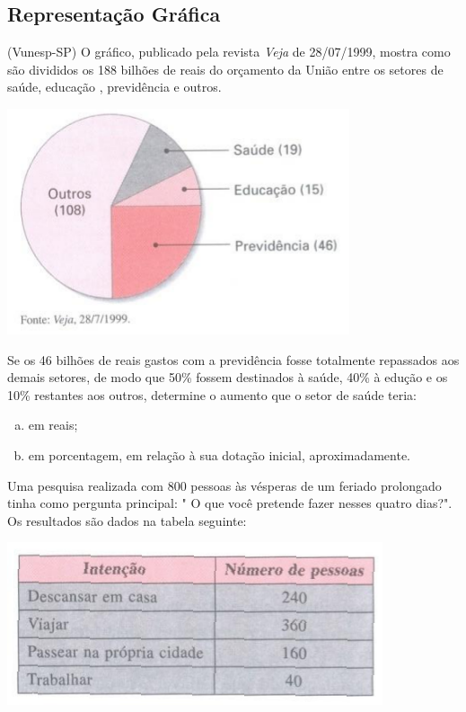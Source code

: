 \subsection{Representação Gráfica}

	\item (Vunesp-SP) O gráfico, publicado pela revista \textit{Veja} de 28/07/1999, mostra como são divididos os 188 bilhões de reais do orçamento da União entre os setores de saúde, educação , previdência e outros.
	
	\begin{center}
		\includegraphics[scale=0.7]{figuras/fig109.png}
	\end{center}	
	
	Se os 46 bilhões de reais gastos com a previdência fosse totalmente repassados aos demais setores, de modo que 50\% fossem destinados à saúde, 40\% à edução e os 10\% restantes aos outros, determine o aumento que o setor de saúde teria:
	\begin{enumerate}[a)]
		\item em reais;
		\item em porcentagem, em relação à sua dotação inicial, aproximadamente.
	\end{enumerate}
	
	\item Uma pesquisa realizada com 800 pessoas às vésperas de um feriado prolongado tinha como pergunta principal: " O que você pretende fazer nesses quatro dias?". Os resultados são dados na tabela seguinte:
	
	\begin{center}
		\includegraphics[scale=0.7]{figuras/fig110.png}
	\end{center}	
	
